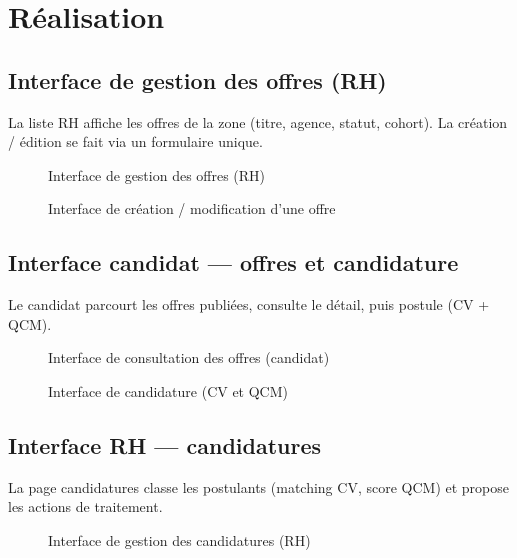 \section{Réalisation}

\subsection{Interface de gestion des offres (RH)}

La liste RH affiche les offres de la zone (titre, agence, statut, cohort).
La création / édition se fait via un formulaire unique.

\begin{figure}[H]
  \centering
  \caption{Interface de gestion des offres (RH)}
  \label{fig:ui-rh-recruitments}
\end{figure}

\begin{figure}[H]
  \centering
  \caption{Interface de création / modification d'une offre}
  \label{fig:ui-rh-recruitment-form}
\end{figure}


\subsection{Interface candidat --- offres et candidature}

Le candidat parcourt les offres publiées, consulte le détail, puis postule
(CV + QCM).

\begin{figure}[H]
  \centering
  \caption{Interface de consultation des offres (candidat)}
  \label{fig:ui-jobs}
\end{figure}

\begin{figure}[H]
  \centering
  \caption{Interface de candidature (CV et QCM)}
  \label{fig:ui-apply}
\end{figure}


\subsection{Interface RH --- candidatures}

La page candidatures classe les postulants (matching CV, score QCM) et
propose les actions de traitement.

\begin{figure}[H]
  \centering
  \caption{Interface de gestion des candidatures (RH)}
  \label{fig:ui-rh-candidates}
\end{figure}


